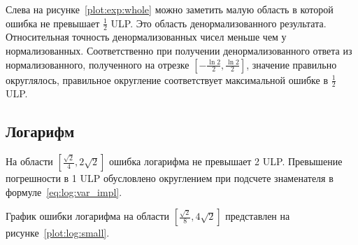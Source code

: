 Слева на рисунке~\ref{plot:exp:whole} можно заметить малую область в которой ошибка не превышает $\frac{1}{2}$ ULP.
Это область денормализованного результата.
Относительная точность денормализованных чисел меньше чем у нормализованных.
Соответственно при получении денормализованного ответа из нормализованного, полученного на отрезке $[-\frac{\ln{2}}{2}, \frac{\ln{2}}{2}]$, значение правильно округлялось, правильное округление соответствует максимальной ошибке в $\frac{1}{2}$ ULP.

\subsection{Логарифм}

На области $[\frac{\sqrt{2}}{4}, 2\sqrt{2}]$ ошибка логарифма не превышает 2 ULP.
Превышение погрешности в 1 ULP обусловлено округлением при подсчете знаменателя в формуле~\ref{eq:log:var_impl}.

График ошибки логарифма на области $[\frac{\sqrt{2}}{8}, 4\sqrt{2}]$ представлен на рисунке~\ref{plot:log:small}.


